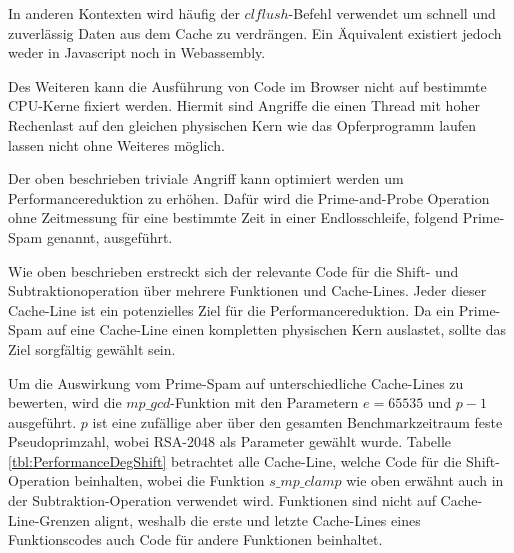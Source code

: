 In anderen Kontexten wird häufig der $clflush$-Befehl verwendet um schnell und zuverlässig Daten aus dem Cache zu verdrängen. 
Ein Äquivalent existiert jedoch weder in Javascript noch in Webassembly.

Des Weiteren kann die Ausführung von Code im Browser nicht auf bestimmte CPU-Kerne fixiert werden. Hiermit sind Angriffe die einen Thread mit hoher Rechenlast auf den gleichen physischen Kern wie das Opferprogramm laufen lassen nicht ohne Weiteres möglich.

Der oben beschrieben triviale Angriff kann optimiert werden um Performancereduktion zu erhöhen. Dafür wird die Prime-and-Probe Operation ohne Zeitmessung für eine bestimmte Zeit in einer Endlosschleife, folgend Prime-Spam genannt, ausgeführt.

Wie oben beschrieben erstreckt sich der relevante Code für die Shift- und Subtraktionoperation über mehrere Funktionen und Cache-Lines.
Jeder dieser Cache-Line ist ein potenzielles Ziel für die Performancereduktion.
Da ein Prime-Spam auf eine Cache-Line einen kompletten physischen Kern auslastet, sollte das Ziel sorgfältig gewählt sein.

Um die Auswirkung vom Prime-Spam auf unterschiedliche Cache-Lines zu bewerten, wird die $mp\_gcd$-Funktion mit den Parametern $e=65535$ und $p-1$ ausgeführt.
$p$ ist eine zufällige aber über den gesamten Benchmarkzeitraum feste Pseudoprimzahl, wobei RSA-2048 als Parameter gewählt wurde.
Tabelle \ref{tbl:PerformanceDegShift} betrachtet alle Cache-Line, welche Code für die Shift-Operation beinhalten, wobei die Funktion $s\_mp\_clamp$ wie oben erwähnt auch in der Subtraktion-Operation verwendet wird.
Funktionen sind nicht auf Cache-Line-Grenzen alignt, weshalb die erste und letzte Cache-Lines eines Funktionscodes auch Code für andere Funktionen beinhaltet.

